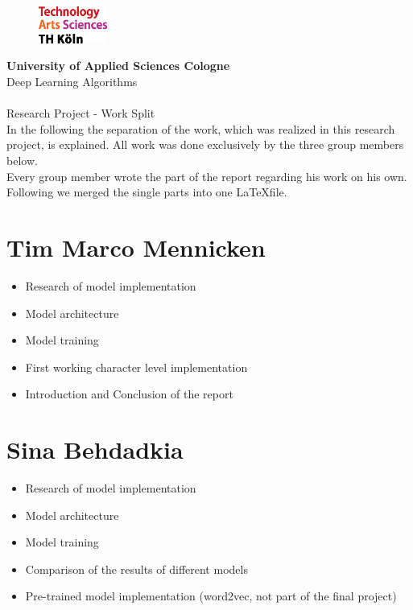 \documentclass[a4paper,11pt,oneside]{article}
\begin{document}
  \pagestyle{fancy} %
  \fancyhead{}
  \fancyhf{}
  \renewcommand{\headrulewidth}{0pt}
  \renewcommand{\footrulewidth}{0.4pt}
  \fancyfoot[R] {}
  \begin{figure}
    \includegraphics[width=0.2\textwidth]{sources/logo_TH-Koeln_CMYK_22pt}
  \end{figure}
  \Large
  \textbf{University of Applied Sciences Cologne}\\
  Deep Learning Algorithms\\
  \\
  \large
  Research Project - Work Split\\

In the following the separation of the work, which was realized in this research project, is explained. All work was done exclusively by the three group members below.\\
Every group member wrote the part of the report regarding his work on his own. Following we merged the single parts into one \LaTeX file.

\section*{Tim Marco Mennicken}

\begin{itemize}
\item Research of model implementation
\item Model architecture
\item Model training
\item First working character level implementation
\item Introduction and Conclusion of the report
\end{itemize}

\section*{Sina Behdadkia}

\begin{itemize}
\item Research of model implementation
\item Model architecture
\item Model training
\item Comparison of the results of different models
\item Pre-trained model implementation (word2vec, not part of the final project)
\end{itemize}
\end{document}

